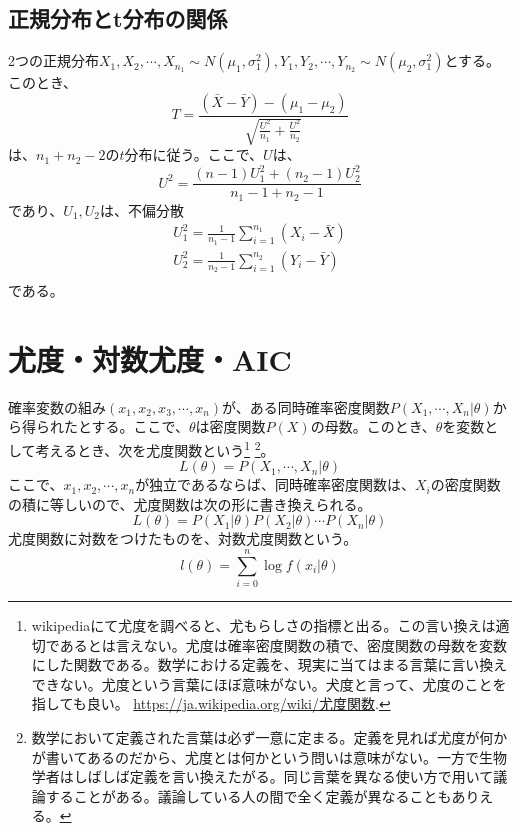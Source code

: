 \subsection{正規分布とt分布の関係}

2つの正規分布$X_1,X_2,\cdots,X_{n_1} \sim N(\mu_1,\sigma_1^2), Y_1,Y_2,\cdots,Y_{n_2}\sim N(\mu_2,\sigma_1^2)$とする。このとき、
\begin{equation*}
    T = \frac{(\bar{X}-\bar{Y})-(\mu_1-\mu_2)}{\sqrt{\frac{U^2}{n_1}+\frac{U^2}{n_2}}}
\end{equation*}
は、$n_1+n_2-2$の$t$分布に従う。ここで、$U$は、
\begin{equation*}
    U^2 = \frac{(n-1)U_1^2+(n_2-1)U_2^2}{n_1-1+n_2-1}
\end{equation*}
であり、$U_1,U_2$は、不偏分散
\begin{eqnarray*}
    U_1^2 = \frac{1}{n_1-1}\sum_{i=1}^{n_1}(X_i-\bar{X})\\
    U_2^2 = \frac{1}{n_2-1}\sum_{i=1}^{n_2}(Y_i-\bar{Y})\\
\end{eqnarray*}
である。

\section{尤度・対数尤度・AIC}
\begin{defi}
    確率変数の組み$(x_1,x_2,x_3,\cdots,x_n)$が、ある同時確率密度関数$P(X_1,\cdots,X_n|\theta)$から得られたとする。ここで、$\theta$は密度関数$P(X)$の母数。このとき、$\theta$を変数として考えるとき、次を尤度関数という\footnote{wikipediaにて尤度を調べると、尤もらしさの指標と出る。この言い換えは適切であるとは言えない。尤度は確率密度関数の積で、密度関数の母数を変数にした関数である。数学における定義を、現実に当てはまる言葉に言い換えできない。尤度という言葉にほぼ意味がない。犬度と言って、尤度のことを指しても良い。
    \url{https://ja.wikipedia.org/wiki/尤度関数}.}
    \footnote{数学において定義された言葉は必ず一意に定まる。定義を見れば尤度が何かが書いてあるのだから、尤度とは何かという問いは意味がない。一方で生物学者はしばしば定義を言い換えたがる。同じ言葉を異なる使い方で用いて議論することがある。議論している人の間で全く定義が異なることもありえる。}。
    \begin{equation*}
        L(\theta) = P(X_1,\cdots,X_n|\theta)
    \end{equation*}
    ここで、$x_1,x_2,\cdots,x_n$が独立であるならば、同時確率密度関数は、$X_i$の密度関数の積に等しいので、尤度関数は次の形に書き換えられる。
    \begin{equation*}
        L(\theta ) = P(X_1|\theta)P(X_2|\theta)\cdots P(X_n|\theta)
    \end{equation*}
    尤度関数に対数をつけたものを、対数尤度関数という。
    \begin{equation*}
        l(\theta) = \sum_{i=0}^n \log f(x_i|\theta)
    \end{equation*}
\end{defi}

